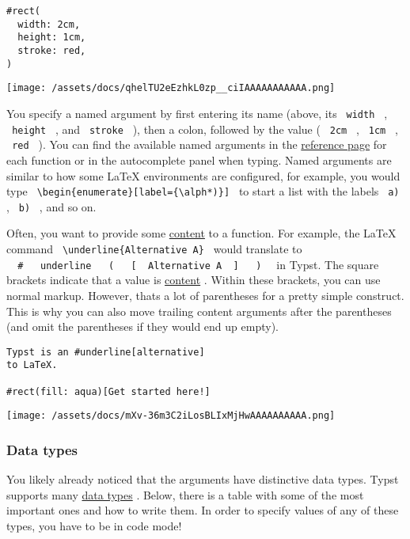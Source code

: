 \begin{verbatim}
#rect(
  width: 2cm,
  height: 1cm,
  stroke: red,
)
\end{verbatim}

\texttt{[image: /assets/docs/qhelTU2eEzhkL0zp\_\_ciIAAAAAAAAAAA.png]}

You specify a named argument by first entering its name (above,
it\textquotesingle s \texttt{\ width\ } , \texttt{\ height\ } , and
\texttt{\ stroke\ } ), then a colon, followed by the value (
\texttt{\ 2cm\ } , \texttt{\ 1cm\ } , \texttt{\ red\ } ). You can find
the available named arguments in the \href{/docs/reference/}{reference
page} for each function or in the autocomplete panel when typing. Named
arguments are similar to how some LaTeX environments are configured, for
example, you would type
\texttt{\ \textbackslash{}begin\{enumerate\}{[}label=\{\textbackslash{}alph*)\}{]}\ }
to start a list with the labels \texttt{\ a)\ } , \texttt{\ b)\ } , and
so on.

Often, you want to provide some
\href{/docs/reference/foundations/content/}{content} to a function. For
example, the LaTeX command
\texttt{\ \textbackslash{}underline\{Alternative\ A\}\ } would translate
to
\texttt{\ }{\texttt{\ \#\ }}\texttt{\ }{\texttt{\ underline\ }}\texttt{\ }{\texttt{\ (\ }}\texttt{\ }{\texttt{\ {[}\ }}\texttt{\ Alternative\ A\ }{\texttt{\ {]}\ }}\texttt{\ }{\texttt{\ )\ }}\texttt{\ }
in Typst. The square brackets indicate that a value is
\href{/docs/reference/foundations/content/}{content} . Within these
brackets, you can use normal markup. However, that\textquotesingle s a
lot of parentheses for a pretty simple construct. This is why you can
also move trailing content arguments after the parentheses (and omit the
parentheses if they would end up empty).

\begin{verbatim}
Typst is an #underline[alternative]
to LaTeX.

#rect(fill: aqua)[Get started here!]
\end{verbatim}

\texttt{[image: /assets/docs/mXv-36m3C2iLosBLIxMjHwAAAAAAAAAA.png]}

\subsubsection{Data types}\label{data-types}

You likely already noticed that the arguments have distinctive data
types. Typst supports many \href{/docs/reference/foundations/type/}{data
types} . Below, there is a table with some of the most important ones
and how to write them. In order to specify values of any of these types,
you have to be in code mode!

